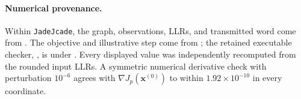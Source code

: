 \documentclass[11pt]{article}
\begin{document}
\paragraph{Numerical provenance.}
Within \texttt{JadeJcade}, the graph, observations, LLRs, and transmitted word
come from
.  The objective and
illustrative step come from
; the retained
executable checker, , is under
.
Every displayed value was independently recomputed from the rounded input
LLRs.  A symmetric numerical derivative check with perturbation \(10^{-6}\)
agrees with
\(\nabla J_p(\boldsymbol{x}^{(0)})\) to within
\(1.92\times10^{-10}\) in every coordinate.
\end{document}
